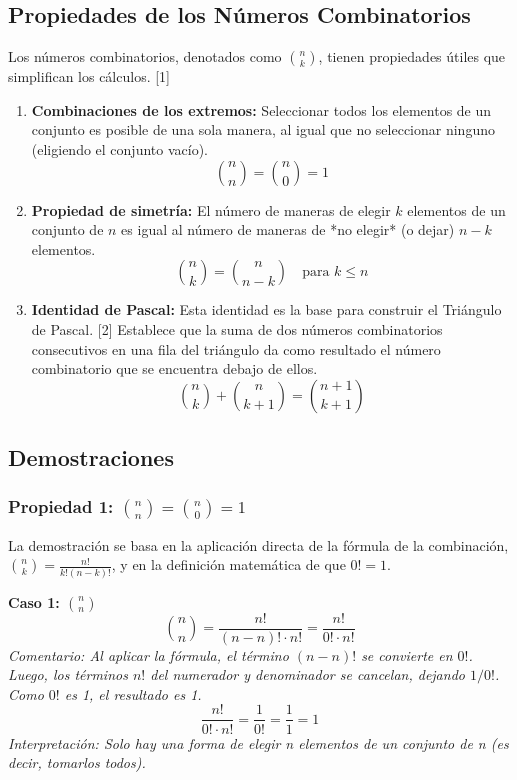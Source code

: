 \documentclass[12pt, letterpaper]{article}
\begin{document}
\subsection{Propiedades de los Números Combinatorios}
Los números combinatorios, denotados como $\binom{n}{k}$, tienen propiedades útiles que simplifican los cálculos. [1]
\begin{enumerate}
    \item \textbf{Combinaciones de los extremos:} Seleccionar todos los elementos de un conjunto es posible de una sola manera, al igual que no seleccionar ninguno (eligiendo el conjunto vacío).
    \[ \binom{n}{n} = \binom{n}{0} = 1 \]

    \item \textbf{Propiedad de simetría:} El número de maneras de elegir $k$ elementos de un conjunto de $n$ es igual al número de maneras de *no elegir* (o dejar) $n-k$ elementos.
    \[ \binom{n}{k} = \binom{n}{n-k} \quad \text{para } k \leq n \]

    \item \textbf{Identidad de Pascal:} Esta identidad es la base para construir el Triángulo de Pascal. [2] Establece que la suma de dos números combinatorios consecutivos en una fila del triángulo da como resultado el número combinatorio que se encuentra debajo de ellos.
    \[ \binom{n}{k} + \binom{n}{k+1} = \binom{n+1}{k+1} \]
\end{enumerate}

\subsection{Demostraciones}
\subsubsection{Propiedad 1: $\binom{n}{n} = \binom{n}{0} = 1$}
La demostración se basa en la aplicación directa de la fórmula de la combinación, $\binom{n}{k} = \frac{n!}{k!(n-k)!}$, y en la definición matemática de que $0! = 1$.

\vspace{1em}
\noindent \textbf{Caso 1: $\binom{n}{n}$}
\[ \binom{n}{n} = \frac{n!}{(n-n)! \cdot n!} = \frac{n!}{0! \cdot n!} \]
\textit{Comentario: Al aplicar la fórmula, el término $(n-n)!$ se convierte en $0!$. Luego, los términos $n!$ del numerador y denominador se cancelan, dejando $1/0!$. Como $0!$ es 1, el resultado es 1.}
\[ \frac{n!}{0! \cdot n!} = \frac{1}{0!} = \frac{1}{1} = 1 \]
\textit{Interpretación: Solo hay una forma de elegir n elementos de un conjunto de n (es decir, tomarlos todos).}
\end{document}
